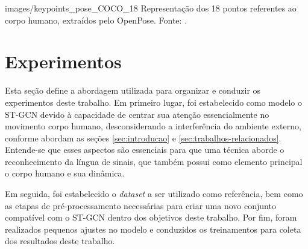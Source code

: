     {images/keypoints_pose_COCO_18}
    {Representação dos 18 pontos referentes ao corpo humano, extraídos pelo OpenPose. Fonte: \cite{openpose-output-2018}.}



\section{Experimentos} %
\label{sec:experimentos}

Esta seção define a abordagem utilizada para organizar e conduzir os experimentos deste trabalho. Em primeiro lugar, foi estabelecido como modelo o ST-GCN devido à capacidade de centrar sua atenção essencialmente no movimento corpo humano, desconsiderando a interferência do ambiente externo, conforme abordam as seções \ref{sec:introducao} e \ref{sec:trabalhos-relacionados}. Entende-se que esses aspectos são essenciais para que uma técnica aborde o reconhecimento da língua de sinais, que também possui como elemento principal o corpo humano e sua dinâmica.

Em seguida, foi estabelecido o \textit{dataset} a ser utilizado como referência, bem como as etapas de pré-processamento necessárias para criar uma novo conjunto compatível com o ST-GCN dentro dos objetivos deste trabalho. Por fim, foram realizados pequenos ajustes no modelo e conduzidos os treinamentos para coleta dos resultados deste trabalho.

